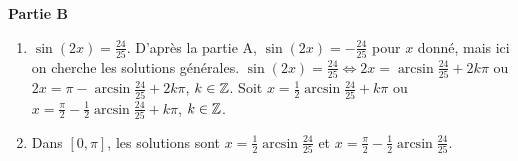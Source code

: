 \textbf{Partie B}
\begin{enumerate}[label=\arabic*)]
    \item $\sin(2x) = \frac{24}{25}$. D'après la partie A, $\sin(2x) = -\frac{24}{25}$ pour $x$ donné, mais ici on cherche les solutions générales.
    $\sin(2x) = \frac{24}{25} \iff 2x = \arcsin\frac{24}{25} + 2k\pi$ ou $2x = \pi - \arcsin\frac{24}{25} + 2k\pi$, $k\in\mathbb{Z}$.
    Soit $x = \frac12\arcsin\frac{24}{25} + k\pi$ ou $x = \frac{\pi}{2} - \frac12\arcsin\frac{24}{25} + k\pi$, $k\in\mathbb{Z}$.
    \item Dans $[0,\pi]$, les solutions sont $x = \frac12\arcsin\frac{24}{25}$ et $x = \frac{\pi}{2} - \frac12\arcsin\frac{24}{25}$.
\end{enumerate}